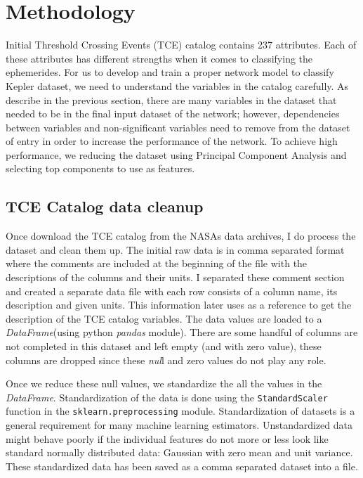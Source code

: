 \chapter{Methodology}

Initial Threshold Crossing Events (TCE) catalog contains 237 attributes. Each of these attributes has different strengths when it comes to classifying the ephemerides. For us to develop and train a proper network model to classify Kepler dataset, we need to understand the variables in the catalog carefully. As describe in the previous section,  there are many variables in the dataset that needed to be in the final input dataset of the network; however, dependencies between variables and non-significant variables need to remove from the dataset of entry in order to increase the performance of the network. To achieve high performance, we reducing the dataset using Principal Component Analysis and selecting top components to use as features. 

\section{TCE Catalog data cleanup}


Once download the TCE catalog from the NASAs data archives, I do process the dataset and clean them up. The initial raw data is in comma separated format where the comments are included at the beginning of the file with the descriptions of the columns and their units. I separated these comment section and created a separate data file with each row consists of a column name, its description and given units. This information later uses as a reference to get the description of the TCE catalog variables. The data values are loaded to a \emph{DataFrame}(using python \emph{pandas} module). There are some handful of columns are not completed in this dataset and left empty (and with zero value), these columns are dropped since these \emph{nul}l and zero values do not play any role.

Once we reduce these null values, we standardize the all the values in the \emph{DataFrame}. Standardization of the data is done using the \texttt{StandardScaler} function in the \texttt{sklearn.preprocessing} module. Standardization of datasets is a general requirement for many machine learning estimators. Unstandardized data might behave poorly if the individual features do not more or less look like standard normally distributed data: Gaussian with zero mean and unit variance. These standardized data has been saved as a comma separated dataset into a file. 

